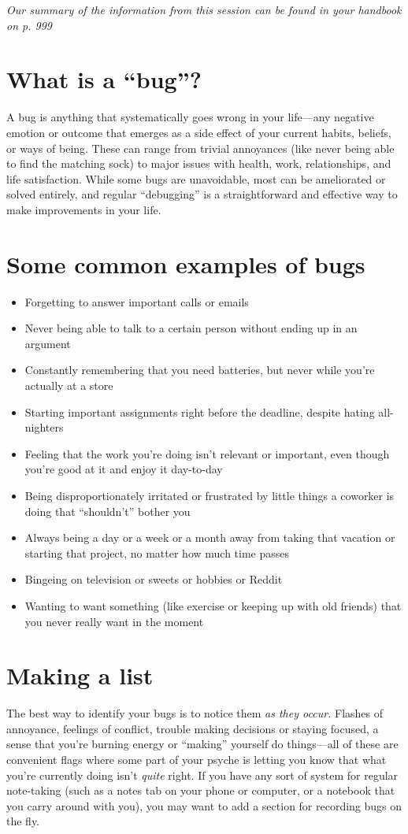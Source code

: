 \setlength{\parindent}{0em}
\emph{Our summary of the information from this session can be found in your handbook on p. 999}

\section*{What is a ``bug''?}
\setlength{\parindent}{1.5em}
A bug is anything that systematically goes wrong in your life---any negative emotion or outcome that emerges as a side effect of your current habits, beliefs, or ways of being.  These can range from trivial annoyances (like never being able to find the matching sock) to major issues with health, work, relationships, and life satisfaction.  While some bugs are unavoidable, most can be ameliorated or solved entirely, and regular ``debugging'' is a straightforward and effective way to make improvements in your life.

\section*{Some common examples of bugs}
\begin{itemize}
\item Forgetting to answer important calls or emails
\item Never being able to talk to a certain person without ending up in an argument
\item Constantly remembering that you need batteries, but never while you're actually at a store
\item Starting important assignments right before the deadline, despite hating all-nighters
\item Feeling that the work you're doing isn't relevant or important, even though you're good at it and enjoy it day-to-day
\item Being disproportionately irritated or frustrated by little things a coworker is doing that ``shouldn't'' bother you
\item Always being a day or a week or a month away from taking that vacation or starting that project, no matter how much time passes
\item Bingeing on television or sweets or hobbies or Reddit
\item Wanting to want something (like exercise or keeping up with old friends) that you never really want in the moment
\end{itemize}


\section*{Making a list}
The best way to identify your bugs is to notice them \emph{as they occur.}  Flashes of annoyance, feelings of conflict, trouble making decisions or staying focused, a sense that you're burning energy or ``making'' yourself do things---all of these are convenient flags where some part of your psyche is letting you know that what you're currently doing isn't \emph{quite} right.  If you have any sort of system for regular note-taking (such as a notes tab on your phone or computer, or a notebook that you carry around with you), you may want to add a section for recording bugs on the fly.

